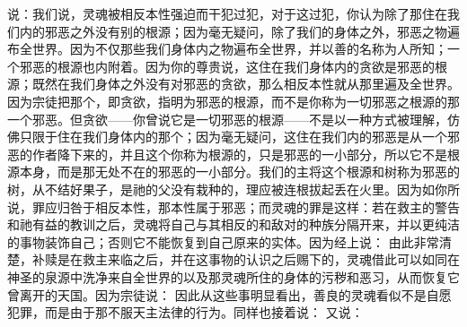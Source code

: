 说：我们说，灵魂被相反本性强迫而干犯过犯，对于这过犯，你认为除了那住在我们内的邪恶之外没有别的根源；因为毫无疑问，除了我们的身体之外，邪恶之物遍布全世界。因为不仅那些我们身体内之物遍布全世界，并以善的名称为人所知；一个邪恶的根源也内附着。因为你的尊贵说，这住在我们身体内的贪欲是邪恶的根源；既然在我们身体之外没有对邪恶的贪欲，那么相反本性就从那里遍及全世界。因为宗徒把那个，即贪欲，指明为邪恶的根源，而不是你称为一切邪恶之根源的那一个邪恶。但贪欲——你曾说它是一切邪恶的根源——不是以一种方式被理解，仿佛只限于住在我们身体内的那个；因为毫无疑问，这住在我们内的邪恶是从一个邪恶的作者降下来的，并且这个你称为根源的，只是邪恶的一小部分，所以它不是根源本身，而是那无处不在的邪恶的一小部分。我们的主将这个根源和树称为邪恶的树，从不结好果子，是祂的父没有栽种的，理应被连根拔起丢在火里。因为如你所说，罪应归咎于相反本性，那本性属于邪恶；而灵魂的罪是这样：若在救主的警告和祂有益的教训之后，灵魂将自己与其相反的和敌对的种族分隔开来，并以更纯洁的事物装饰自己；否则它不能恢复到自己原来的实体。因为经上说： 由此非常清楚，补赎是在救主来临之后，并在这事物的认识之后赐下的，灵魂借此可以如同在神圣的泉源中洗净来自全世界的以及那灵魂所住的身体的污秽和恶习，从而恢复它曾离开的天国。因为宗徒说： 因此从这些事明显看出，善良的灵魂看似不是自愿犯罪，而是由于那不服天主法律的行为。同样也接着说： 又说： \par

